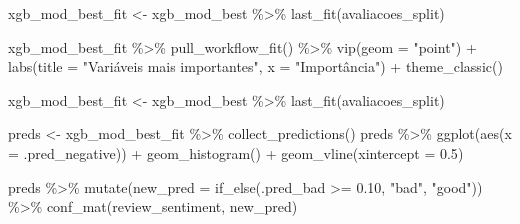 \documentclass[
]{article}
\newenvironment{Shaded}{\begin{snugshade}}{\end{snugshade}}
\newcommand{\AttributeTok}[1]{\textcolor[rgb]{0.77,0.63,0.00}{#1}}
\newcommand{\FloatTok}[1]{\textcolor[rgb]{0.00,0.00,0.81}{#1}}
\newcommand{\FunctionTok}[1]{\textcolor[rgb]{0.00,0.00,0.00}{#1}}
\newcommand{\NormalTok}[1]{#1}
\newcommand{\OtherTok}[1]{\textcolor[rgb]{0.56,0.35,0.01}{#1}}
\newcommand{\SpecialCharTok}[1]{\textcolor[rgb]{0.00,0.00,0.00}{#1}}
\newcommand{\StringTok}[1]{\textcolor[rgb]{0.31,0.60,0.02}{#1}}
\begin{document}
\begin{Shaded}
\begin{Highlighting}[]
\NormalTok{xgb\_mod\_best\_fit }\OtherTok{\textless{}{-}}\NormalTok{ xgb\_mod\_best }\SpecialCharTok{\%\textgreater{}\%}
  \FunctionTok{last\_fit}\NormalTok{(avaliacoes\_split)}

\NormalTok{xgb\_mod\_best\_fit }\SpecialCharTok{\%\textgreater{}\%}
  \FunctionTok{pull\_workflow\_fit}\NormalTok{() }\SpecialCharTok{\%\textgreater{}\%}
  \FunctionTok{vip}\NormalTok{(}\AttributeTok{geom =} \StringTok{"point"}\NormalTok{) }\SpecialCharTok{+} 
  \FunctionTok{labs}\NormalTok{(}\AttributeTok{title =} \StringTok{"Variáveis mais importantes"}\NormalTok{, }\AttributeTok{x =} \StringTok{"Importância"}\NormalTok{) }\SpecialCharTok{+}
  \FunctionTok{theme\_classic}\NormalTok{()}

\NormalTok{xgb\_mod\_best\_fit }\OtherTok{\textless{}{-}}\NormalTok{ xgb\_mod\_best }\SpecialCharTok{\%\textgreater{}\%} \FunctionTok{last\_fit}\NormalTok{(avaliacoes\_split) }

\NormalTok{preds }\OtherTok{\textless{}{-}}\NormalTok{ xgb\_mod\_best\_fit }\SpecialCharTok{\%\textgreater{}\%} \FunctionTok{collect\_predictions}\NormalTok{()}
\NormalTok{preds }\SpecialCharTok{\%\textgreater{}\%}
  \FunctionTok{ggplot}\NormalTok{(}\FunctionTok{aes}\NormalTok{(}\AttributeTok{x =}\NormalTok{ .pred\_negative)) }\SpecialCharTok{+}
  \FunctionTok{geom\_histogram}\NormalTok{() }\SpecialCharTok{+} 
  \FunctionTok{geom\_vline}\NormalTok{(}\AttributeTok{xintercept =} \FloatTok{0.5}\NormalTok{)}

\NormalTok{preds }\SpecialCharTok{\%\textgreater{}\%}
  \FunctionTok{mutate}\NormalTok{(}\AttributeTok{new\_pred =} \FunctionTok{if\_else}\NormalTok{(.pred\_bad }\SpecialCharTok{\textgreater{}=} \FloatTok{0.10}\NormalTok{, }\StringTok{"bad"}\NormalTok{, }\StringTok{"good"}\NormalTok{)) }\SpecialCharTok{\%\textgreater{}\%}
  \FunctionTok{conf\_mat}\NormalTok{(review\_sentiment, new\_pred)}
\end{Highlighting}
\end{Shaded}
\end{document}
